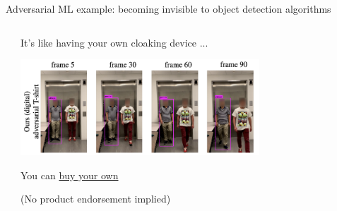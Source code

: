 \begin{frame}{Adversarial ML example: becoming invisible to object detection algorithms}
  \begin{columns}[T] %
    \begin{column}{.3\textwidth}

      \begin{center}
      \end{center}
      \cite{xu2020adversarial}\newline

    \end{column}%
    \begin{column}{.7\textwidth}
      \hspace{0.2\textwidth}It's like having your own cloaking device ...
      \begin{center}

        \includegraphics[width=0.7\textwidth]{graphics/cloaking-device}

        \end{center}
        \hspace{0.2\textwidth}You can \href{https://adversarial-designs.shop/collections/t-shirts-and-apparel}{buy your own}

        \hspace{0.2\textwidth}(No product endorsement implied)
    \end{column}%
\end{columns}
\end{frame}

